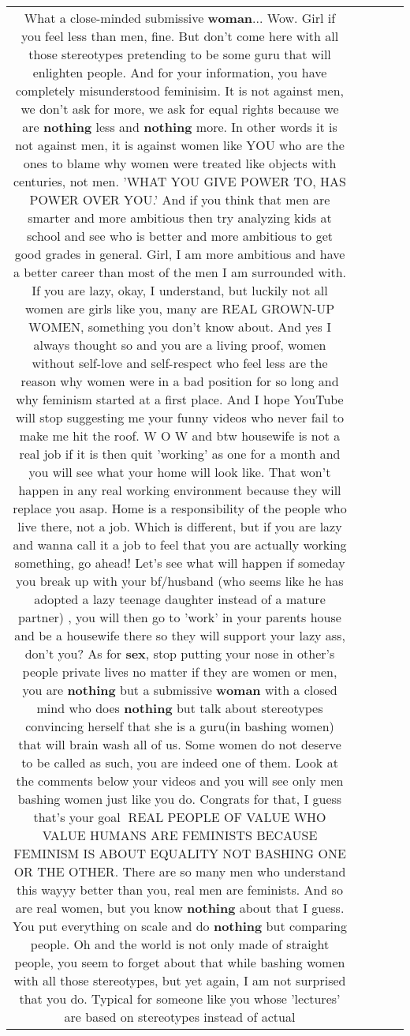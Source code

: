\documentclass[11pt]{article}
\newlength\mylength
\begin{document}
\begin{center}
\begin{longtable}{|C{.65\mylength}|C{.30\mylength}|C{.12\mylength}|C{.12\mylength}|C{.12\mylength}|}
  \small What a close-minded submissive \textbf{woman}... Wow. Girl if you feel less than men, fine. But don't come here with all those stereotypes pretending to be some guru that will enlighten people. And for your information, you have completely misunderstood feminisim. It is not against men, we don't ask for more, we ask for equal rights because we are \textbf{nothing} less and \textbf{nothing} more. In other words it is not against men, it is against women like YOU who are the ones to blame why women were treated like objects with centuries, not men. 'WHAT YOU GIVE POWER TO, HAS POWER OVER YOU.'  And if you think that men are smarter and more ambitious then try analyzing kids at school and see who is better and more ambitious to get good grades in general. Girl, I am more ambitious and have a better career than most of the men I am surrounded with. If you are lazy, okay, I understand, but luckily not all women are girls like you, many are REAL GROWN-UP WOMEN, something you don't know about. And yes I always thought so and you are a living proof, women without self-love and self-respect who feel less are the reason why women were in a bad position for so long and why feminism started at a first place. And I hope YouTube will stop suggesting me your funny videos who never fail to make me hit the roof. W O W and btw housewife is not a real job if it is then quit 'working' as one for a month and you will see what your home will look like. That won't happen in any real working environment because they will replace you asap. Home is a responsibility of the people who live there, not a job. Which is different, but if you are lazy and wanna call it a job to feel that you are actually working something, go ahead! Let's see what will happen if someday you break up with your bf/husband (who seems like he has adopted a lazy teenage daughter instead of a mature partner) , you will then go to 'work' in your parents house and be a housewife there so they will support your lazy ass, don't you? As for \textbf{sex}, stop putting your nose in other's people private lives no matter if they are women or men, you are \textbf{nothing} but a submissive \textbf{woman} with a closed mind who does \textbf{nothing} but talk about stereotypes convincing herself that she is a guru(in bashing women) that will brain wash all of us. Some women do not deserve to be called as such, you are indeed one of them. Look at the comments below your videos and you will see only men bashing women just like you do. Congrats for that, I guess that's your goal 👏REAL PEOPLE OF VALUE WHO VALUE HUMANS ARE FEMINISTS BECAUSE FEMINISM IS ABOUT EQUALITY NOT BASHING ONE OR THE OTHER. There are so many men who understand this wayyy better than you, real men are feminists. And so are real women, but you know \textbf{nothing} about that I guess. You put everything on scale and do \textbf{nothing} but comparing people. Oh and the world is not only made of straight people, you seem to forget about that while bashing women with all those stereotypes, but yet again, I am not surprised that you do. Typical for someone like you whose 'lectures' are based on stereotypes instead of actual 
\end{longtable}
\end{center}
\end{document}
